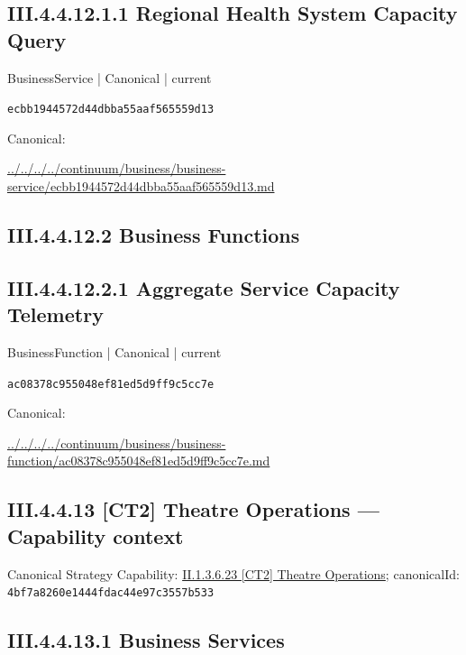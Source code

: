 \documentclass[10pt,a4paper]{article}
\begin{document}
\subsection*{III.4.4.12.1.1 Regional Health System Capacity Query}
\label{element-ecbb1944572d44dbba55aaf565559d13}
{\small BusinessService | Canonical | current}\par
\texttt{ecbb1944572d44dbba55aaf565559d13}\par
Canonical: \par
{\footnotesize\url{../../../../continuum/business/business-service/ecbb1944572d44dbba55aaf565559d13.md}}\par
\subsection*{III.4.4.12.2 Business Functions}
\subsection*{III.4.4.12.2.1 Aggregate Service Capacity Telemetry}
\label{element-ac08378c955048ef81ed5d9ff9c5cc7e}
{\small BusinessFunction | Canonical | current}\par
\texttt{ac08378c955048ef81ed5d9ff9c5cc7e}\par
Canonical: \par
{\footnotesize\url{../../../../continuum/business/business-function/ac08378c955048ef81ed5d9ff9c5cc7e.md}}\par
\subsection*{III.4.4.13 [CT2] Theatre Operations — Capability context}
Canonical Strategy Capability: \hyperref[element-4bf7a8260e1444fdac44e97c3557b533]{II.1.3.6.23 [CT2] Theatre Operations}; canonicalId: \texttt{4bf7a8260e1444fdac44e97c3557b533}\par
\subsection*{III.4.4.13.1 Business Services}
\end{document}
